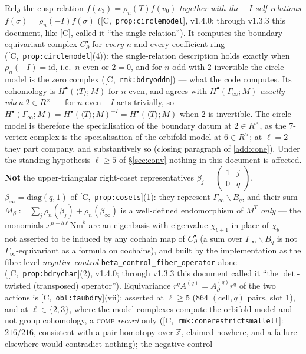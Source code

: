 \documentclass[11pt]{article}
\theoremstyle{remark}
\newcommand{\Z}{\mathbb{Z}}
\newcommand{\Ga}{\Gamma}
\newcommand{\smat}[4]{\begin{pmatrix} #1 & #2 \\ #3 & #4 \end{pmatrix}}
\newcommand{\HA}[1]{[C,~\texttt{#1}]}      %
\begin{document}
\begin{enumerate}[label=(A\arabic*)]
  $\mathrm{Rel}_\partial$ the cusp relation $f(v_3)=\rho_n(T)f(v_0)$ \emph{together with the
  $-I$ self-relations} $f(\sigma)=\rho_n(-I)f(\sigma)$ (\HA{prop:circlemodel}, v1.4.0; through
  v1.3.3 this document, like [C], called it ``the single relation''). It computes the boundary
  equivariant complex $C^\bullet_\partial$ for \emph{every} $n$ and every coefficient ring
  (\HA{prop:circlemodel}(4)): the single-relation description holds exactly when
  $\rho_n(-I)=\mathrm{id}$, i.e.\ $n$ even or $2=0$, and for $n$ odd with $2$ invertible the
  circle model is the zero complex (\HA{rmk:bdryoddn}) --- what the code computes. Its
  cohomology is $H^\bullet(\langle T\rangle;M)$ for $n$ even, and agrees with
  $H^\bullet(\Ga_\infty;M)$ \emph{exactly when}
  $2\in R^\times$ --- for $n$ even $-I$ acts trivially, so
  $H^\bullet(\Ga_\infty;M)=H^\bullet(\langle T\rangle;M)^{-I}=H^\bullet(\langle T\rangle;M)$ when $2$
  is invertible. The circle model is therefore the specialisation of the boundary datum at
  $2\in R^\times$, as the 7-vertex complex is the specialisation of the orbifold model at
  $6\in R^\times$; at $\ell=2$ they part company, and substantively so (closing paragraph
  of \ref{add:cone}). Under the standing hypothesis $\ell\ge5$ of \S\ref{sec:conv} nothing in this
  document is affected.
  \textbf{Not} the upper-triangular right-coset representatives $\beta_j=\smat1j0q$,
  $\beta_\infty=\mathrm{diag}(q,1)$ of \HA{prop:cosets}(1): they represent
  $\Ga_\infty\backslash B_q$, and their sum
  $M_\beta:=\sum_j\rho_n(\beta_j)+\rho_n(\beta_\infty)$ is a well-defined endomorphism of $M^T$
  \emph{only} --- the monomials $x^{n-b\ell}\mathrm{Nm}^b$ are an eigenbasis with eigenvalue
  $\chi_{b+1}$ in place of $\chi_b$ --- not asserted to be induced by any cochain map of
  $C^\bullet_\partial$ (a sum over $\Ga_\infty\backslash B_q$ is not $\Ga_\infty$-equivariant as
  a formula on cochains), and built by the implementation as the fibre-level \emph{negative
  control} \texttt{beta\_control\_fiber\_operator} alone (\HA{prop:bdrychar}(2), v1.4.0; through
  v1.3.3 this document called it ``the $\det$-twisted (transposed) operator''). Equivariance
  $r^qA^{(q)}=A^{(q)}_\partial r^q$ of the two actions is \HA{obl:taubdry}(vii): asserted at
  $\ell\ge5$ ($864$ $(\text{cell},q)$ pairs, slot 1), and at $\ell\in\{2,3\}$, where the model
  complexes compute the orbifold model and not group cohomology, a \textsc{comp} \emph{record}
  only (\HA{rmk:conerestrictsmallell}: $216/216$, consistent with a pair homotopy over $\Z$,
  claimed nowhere, and a failure elsewhere would contradict nothing); the negative control

\end{enumerate}
\end{document}
